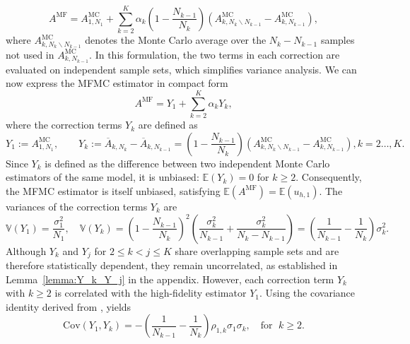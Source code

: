 %
\begin{equation}\label{eq:MFMC_estimator_independent}
    A^{\text{MF}} = A^{\text{MC}}_{1,N_1} +  \sum_{k=2}^K \alpha_k\left(1-\frac{N_{k-1}}{N_{k}}\right)\left(A_{k,N_k\backslash N_{k-1}}^{\text{MC}}-A_{k,N_{k-1}}^{\text{MC}}\right),
\end{equation}
%
where $A^{\text{MC}}_{k,N_k \backslash N_{k-1}}$ denotes the Monte Carlo average over the $N_k - N_{k-1}$ samples not used in $A^{\text{MC}}_{k,N_{k-1}}$. In this formulation, the two terms in each correction are evaluated on independent sample sets, which simplifies variance analysis. We can now express the MFMC estimator in compact form
%
\begin{equation*}\label{eq:MFMC_estimator_Correction}
A^{\text{MF}} = Y_1 + \sum_{k=2}^K \alpha_k Y_k,
\end{equation*}
%
where the correction terms $Y_k$ are defined as
%
\begin{equation} \label{eq:MFMC_Yk}
Y_1 :=A^{\text{MC}}_{1,N_1},\qquad Y_k:=\overline{A}_{k,N_k} - \overline{A}_{k,N_{k-1}}=\left(1-\frac{N_{k-1}}{N_{k}}\right)\left(A_{k,N_k\backslash N_{k-1}}^{\text{MC}}-A_{k,N_{k-1}}^{\text{MC}}\right), k=2\ldots, K.
\end{equation}
%
Since $Y_k$ is defined as the difference between two independent Monte Carlo estimators of the same model, it is unbiased: $\mathbb{E}(Y_k) = 0$ for $k\ge 2$. Consequently, the MFMC estimator is itself unbiased, satisfying $\mathbb{E}(A^{\text{MF}}) = \mathbb{E}(u_{h,1})$. The variances of the correction terms $Y_k$ are
%
\begin{equation}\label{eq:Var_Yk}
    \mathbb{V}\left(Y_1\right) = \frac{\sigma_1^2}{N_1}, \quad \mathbb{V}\left(Y_k\right) = \left(1-\frac{N_{k-1}}{N_{k}}\right)^2\left(\frac{\sigma_k^2}{N_{k-1}}+\frac{\sigma_k^2}{N_k-N_{k-1}}\right) = \left(\frac{1}{N_{k-1}} - \frac{1}{N_k}\right)\sigma_k^2.
\end{equation}
%
Although $Y_k$ and $Y_j$ for $2\le k<j \le K$ share overlapping sample sets and are therefore statistically dependent, they remain uncorrelated, as established in Lemma~\ref{lemma:Y_k_Y_j} in the appendix. However, each correction term $Y_k$ with $k\ge 2$ is correlated with the high-fidelity estimator $Y_1$. Using the covariance identity derived from \cite[Lemma~3.2]{PeWiGu:2016}, yields
%
\begin{equation}\label{eq:Cov_Yk}
\text{Cov}(Y_1,Y_k) = - \left(\frac{1}{N_{k-1}} - \frac{1}{N_k}\right)\rho_{1,k}\sigma_1\sigma_k, \quad \text{for } \; k\ge 2.
\end{equation}
